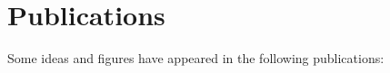 \chapter*{Publications}
Some ideas and figures have appeared in the following publications:




\begin{refsection}
    \nocite{moorjani-etal-2022-audience}
    \printbibliography[heading=none]
\end{refsection}


